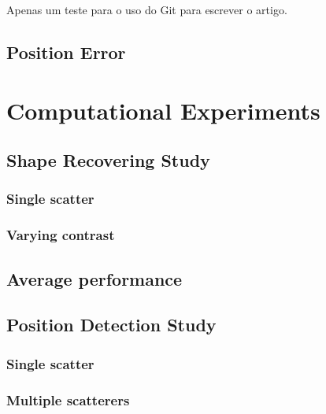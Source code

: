\documentclass{IEEEtran}
\begin{document}
            Apenas um teste para o uso do Git para escrever o artigo.
			
			
		\subsection{Position Error}\label{sec:indicators:positionerror}
	
	\section{Computational Experiments}\label{sec:results}
	
	
		\subsection{Shape Recovering Study}\label{sec:results:shape}
		
			
			\subsubsection{Single scatter}\label{sec:results:shape:star}
			
			\subsubsection{Varying contrast}\label{sec:results:shape:varying}
			
			\subsection{Average performance}\label{sec:results:shape:average}
		
		\subsection{Position Detection Study}\label{sec:results:position}
		
			\subsubsection{Single scatter}\label{sec:results:position:single}
			
			\subsubsection{Multiple scatterers}\label{sec:results:position:multiple}
			
\end{document}
